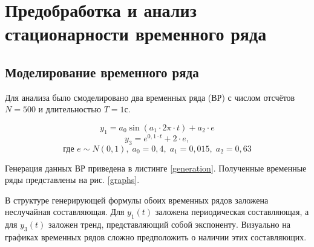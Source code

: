 \section{ Предобработка и анализ стационарности временного ряда }

\subsection{ Моделирование временного ряда }

Для анализа было смоделировано два временных ряда (ВР) с числом отсчётов $N = 500$ и длительностью $T = 1$с.

\begin{equation*}
	y_1 = a_0 \sin \left( a_1 \cdot 2\pi \cdot t\right) + a_2 \cdot e
\end{equation*}
\begin{equation*}
	y_3 = e^{0,1\cdot t} + 2 \cdot e,
\end{equation*}
\begin{equation*}
	\text{где } e \sim N(0, 1), \; a_0 = 0,4,\;a_1 = 0,015,\; a_2 = 0,63 
\end{equation*}

Генерация данных ВР приведена в листинге \ref{generation}. Полученные временные ряды представлены на рис. \ref{graphs}.

В структуре генерирующей формулы обоих временных рядов заложена неслучайная составляющая. Для $y_1(t)$ заложена периодическая составляющая, а для $y_3(t)$ заложен тренд, представляющий собой экспоненту. Визуально на графиках временных рядов сложно предположить о наличии этих составляющих.

